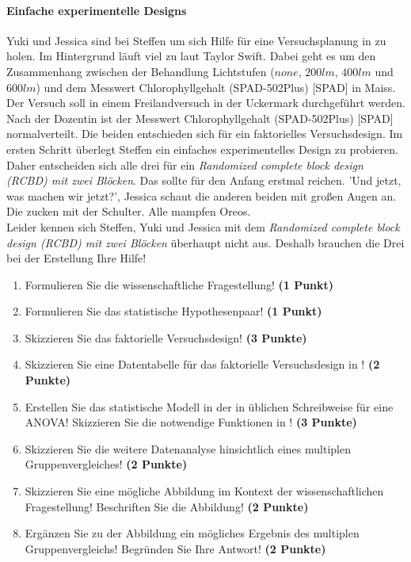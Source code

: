 \documentclass[a4paper, 9pt]{scrartcl}\usepackage[]{graphicx}\usepackage[]{xcolor}
\begin{document}
\paragraph{Einfache experimentelle Designs}

Yuki und Jessica sind bei Steffen um sich Hilfe für eine Versuchsplanung in \Rlogo zu holen. Im Hintergrund läuft viel zu laut Taylor Swift. Dabei geht es um den Zusammenhang zwischen der Behandlung Lichtstufen ($none$, $200lm$, $400lm$ und $600lm$) und dem Messwert Chlorophyllgehalt (SPAD-502Plus) [SPAD] in Maiss. Der Versuch soll in einem Freilandversuch in der Uckermark durchgeführt werden. Nach der Dozentin ist der Messwert Chlorophyllgehalt (SPAD-502Plus) [SPAD] normalverteilt. Die beiden entschieden sich für ein faktorielles Versuchsdesign. Im ersten Schritt überlegt Steffen ein einfaches experimentelles Design zu probieren. Daher entscheiden sich alle drei für ein \textit{Randomized complete block design (RCBD) mit zwei Blöcken}. Das sollte für den Anfang erstmal reichen. 'Und jetzt, was machen wir jetzt?', Jessica schaut die anderen beiden mit großen Augen an. Die zucken mit der Schulter. Alle mampfen Oreos.\\

Leider kennen sich Steffen, Yuki und Jessica mit dem \textit{Randomized complete block design (RCBD) mit zwei Blöcken} überhaupt nicht aus. Deshalb brauchen die Drei bei der Erstellung Ihre Hilfe!

\begin{enumerate}
  \setcounter{enumi}{0}
  \item Formulieren Sie die wissenschaftliche Fragestellung! \textbf{(1 Punkt)}
  \item Formulieren Sie das statistische Hypothesenpaar! \textbf{(1 Punkt)}
  \item Skizzieren Sie das faktorielle Versuchsdesign! \textbf{(3 Punkte)}
  \item Skizzieren Sie eine Datentabelle für das faktorielle Versuchsdesign in \Rlogo! \textbf{(2 Punkte)}
  \item Erstellen Sie das statistische Modell in der in \Rlogo üblichen Schreibweise für eine ANOVA! Skizzieren Sie die notwendige Funktionen in \Rlogo! \textbf{(3 Punkte)}
  \item Skizzieren Sie die weitere Datenanalyse hinsichtlich eines multiplen Gruppenvergleiches! \textbf{(2 Punkte)}
  \item Skizzieren Sie eine mögliche Abbildung im Kontext der wissenschaftlichen Fragestellung! Beschriften Sie die Abbildung! \textbf{(2 Punkte)}
  \item Ergänzen Sie zu der Abbildung ein mögliches Ergebnis des multiplen Gruppenvergleichs! Begründen Sie Ihre Antwort! \textbf{(2 Punkte)}
\end{enumerate}
\end{document}
